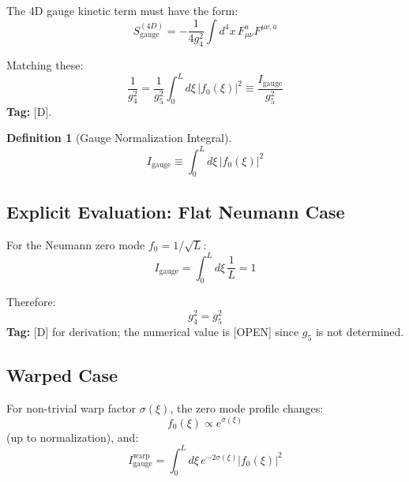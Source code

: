 \documentclass[11pt,a4paper]{article}
\newtheorem{definition}[theorem]{Definition}
\begin{document}
The 4D gauge kinetic term must have the form:
\begin{equation}
  S_{\text{gauge}}^{(4D)} = -\frac{1}{4g_4^2} \int d^4x \, F_{\mu\nu}^a F^{\mu\nu,a}
  \label{eq:4d-standard}
\end{equation}

Matching these:
\begin{equation}
  \boxed{\frac{1}{g_4^2} = \frac{1}{g_5^2} \int_0^L d\xi \, |f_0(\xi)|^2 \equiv \frac{I_{\text{gauge}}}{g_5^2}}
  \label{eq:gauge-bridge}
\end{equation}
\textbf{Tag:} [D].

\begin{definition}[Gauge Normalization Integral]
\begin{equation}
  I_{\text{gauge}} \equiv \int_0^L d\xi \, |f_0(\xi)|^2
  \label{eq:I-gauge-def}
\end{equation}
\end{definition}

\subsection{Explicit Evaluation: Flat Neumann Case}

For the Neumann zero mode $f_0 = 1/\sqrt{L}$:
\begin{equation}
  I_{\text{gauge}} = \int_0^L d\xi \, \frac{1}{L} = 1
  \label{eq:I-gauge-neumann}
\end{equation}

Therefore:
\begin{equation}
  \boxed{g_4^2 = g_5^2}
  \label{eq:g4-flat}
\end{equation}
\textbf{Tag:} [D] for derivation; the numerical value is [OPEN] since $g_5$ is not determined.

\subsection{Warped Case}

For non-trivial warp factor $\sigma(\xi)$, the zero mode profile changes:
\begin{equation}
  f_0(\xi) \propto e^{\sigma(\xi)}
  \label{eq:warped-zero-mode}
\end{equation}
(up to normalization), and:
\begin{equation}
  I_{\text{gauge}}^{\text{warp}} = \int_0^L d\xi \, e^{-2\sigma(\xi)} |f_0(\xi)|^2
  \label{eq:I-gauge-warped}
\end{equation}
\end{document}
